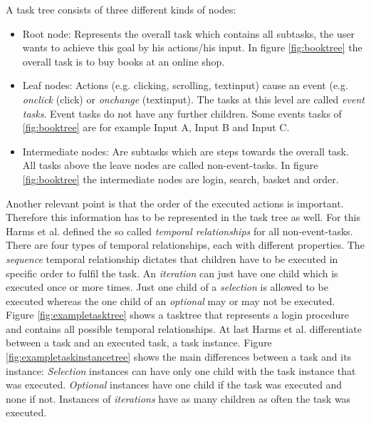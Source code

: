 A task tree consists of three different kinds of nodes:
\begin{itemize} 
	\item Root node: Represents the overall task which contains all subtasks, the user wants to achieve this goal by his actions/his input. 
		In figure \ref{fig:booktree} the overall task is to buy books at an online shop.
	\item Leaf nodes: Actions (e.g. clicking, scrolling, textinput) cause an event (e.g. \textit{onclick} (click) or \textit{onchange} (textinput). The tasks at this level are called \textit{event tasks}. Event tasks do not have any further children. Some events tasks of \ref{fig:booktree} are for example Input A, Input B and Input C.
	\item Intermediate nodes: Are subtasks which are steps towards the overall task. All tasks above the leave nodes are called non-event-tasks. In figure \ref{fig:booktree} the intermediate nodes are login, search, basket and order.
\end{itemize}
Another relevant point is that the order of the executed actions is important. 
Therefore this information has to be represented in the task tree as well. 
For this Harms et al. defined the so called \textit{temporal relationships} for all non-event-tasks. 
There are four types of temporal relationships, each with different properties. 
The \textit{sequence} temporal relationship dictates that children have to be executed in specific order to fulfil the task. 
An \textit{iteration} can just have one child which is executed once or more times. 
Just one child of a \textit{selection} is allowed to be executed whereas the one child of an \textit{optional} may or may not be executed. 
Figure \ref{fig:exampletasktree} shows a tasktree that represents a login procedure and contains all possible temporal relationships. 
At last Harms et al. differentiate between a task and an executed task, a task instance. 
Figure \ref{fig:exampletaskinstancetree} shows the main differences between a task and its instance: \textit{Selection} instances can have only one child with the task instance that was executed. \textit{Optional} instances have one child if the task was executed and none if not. Instances of \textit{iterations} have as many children as often the task was executed.
